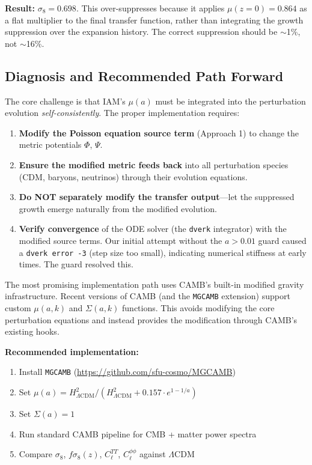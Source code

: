 \documentclass[11pt,letterpaper]{article}
\begin{document}
\textbf{Result:} $\sigma_8 = 0.698$. This over-suppresses because it applies $\mu(z=0) = 0.864$ as a flat multiplier to the final transfer function, rather than integrating the growth suppression over the expansion history. The correct suppression should be $\sim$1\%, not $\sim$16\%.

\subsection{Diagnosis and Recommended Path Forward}

The core challenge is that IAM's $\mu(a)$ must be integrated into the perturbation evolution \textit{self-consistently}. The proper implementation requires:

\begin{enumerate}
\item \textbf{Modify the Poisson equation source term} (Approach 1) to change the metric potentials $\Phi$, $\Psi$.

\item \textbf{Ensure the modified metric feeds back} into all perturbation species (CDM, baryons, neutrinos) through their evolution equations.

\item \textbf{Do NOT separately modify the transfer output}---let the suppressed growth emerge naturally from the modified evolution.

\item \textbf{Verify convergence} of the ODE solver (the \texttt{dverk} integrator) with the modified source terms. Our initial attempt without the $a > 0.01$ guard caused a \texttt{dverk error -3} (step size too small), indicating numerical stiffness at early times. The guard resolved this.
\end{enumerate}

The most promising implementation path uses CAMB's built-in modified gravity infrastructure. Recent versions of CAMB (and the \texttt{MGCAMB} extension) support custom $\mu(a,k)$ and $\Sigma(a,k)$ functions. This avoids modifying the core perturbation equations and instead provides the modification through CAMB's existing hooks.

\textbf{Recommended implementation:}

\begin{enumerate}
\item Install \texttt{MGCAMB} (\url{https://github.com/sfu-cosmo/MGCAMB})
\item Set $\mu(a) = H^2_{\Lambda\text{CDM}}/(H^2_{\Lambda\text{CDM}} + 0.157 \cdot e^{1-1/a})$
\item Set $\Sigma(a) = 1$
\item Run standard CAMB pipeline for CMB + matter power spectra
\item Compare $\sigma_8$, $f\sigma_8(z)$, $C_\ell^{TT}$, $C_\ell^{\phi\phi}$ against $\Lambda$CDM
\end{enumerate}
\end{document}
